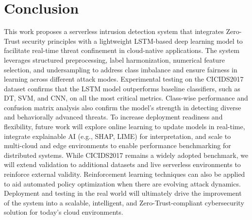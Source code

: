 \documentclass[conference]{IEEEtran}
\begin{document}
\section{Conclusion}\label{sec5}
This work proposes a serverless intrusion detection system that integrates Zero-Trust security principles with a lightweight LSTM-based deep learning model to facilitate real-time threat confinement in cloud-native applications. The system leverages structured preprocessing, label harmonization, numerical feature selection, and undersampling to address class imbalance and ensure fairness in learning across different attack modes. Experimental testing on the CICIDS2017 dataset confirms that the LSTM model outperforms baseline classifiers, such as DT, SVM, and CNN, on all the most critical metrics. Class-wise performance and confusion matrix analysis also confirm the model's strength in detecting diverse and behaviorally advanced threats. To increase deployment readiness and flexibility, future work will explore online learning to update models in real-time, integrate explainable AI (e.g., SHAP, LIME) for interpretation, and scale to multi-cloud and edge environments to enable performance benchmarking for distributed systems. While CICIDS2017 remains a widely adopted benchmark, we will extend validation to additional datasets and live serverless environments to reinforce external validity.   Reinforcement learning techniques can also be applied to aid automated policy optimization when there are evolving attack dynamics. Deployment and testing in the real world will ultimately drive the improvement of the system into a scalable, intelligent, and Zero-Trust-compliant cybersecurity solution for today's cloud environments.




\end{document}
